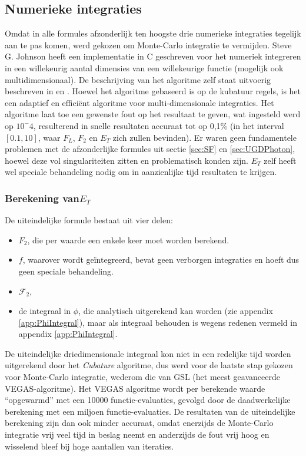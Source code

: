 \documentclass[a4paper,11pt]{article}
\numberwithin{equation}{section} %
\begin{document}
  \subsection{Numerieke integraties}
Omdat in alle formules afzonderlijk ten hoogste drie numerieke integraties tegelijk aan te pas komen, werd gekozen om Monte-Carlo integratie te vermijden.
Steve G. Johnson heeft een implementatie in C geschreven voor het numeriek integreren in een willekeurig aantal dimensies van een willekeurige functie (mogelijk ook multidimensionaal).
De beschrijving van het algoritme zelf staat uitvoerig beschreven in \cite{Genz} en \cite{Berntsen}.
Hoewel het algoritme gebaseerd is op de kubatuur regels, is het een adaptief en efficiënt algoritme voor multi-dimensionale integraties.
Het algoritme laat toe een gewenste fout op het resultaat te geven, wat ingesteld werd op $10^-4$, resulterend in snelle resultaten accuraat tot op 0,1\% (in het interval $[0.1,10]$, waar $F_L$, $F_2$ en $E_T$ zich zullen bevinden).
Er waren geen fundamentele problemen met de afzonderlijke formules uit sectie \ref{sec:SF} en \ref{sec:UGDPhoton}, hoewel deze vol singulariteiten zitten en problematisch konden zijn.
$E_T$ zelf heeft wel speciale behandeling nodig om in aanzienlijke tijd resultaten te krijgen.

  \subsubsection{Berekening van$E_T$}
De uiteindelijke formule bestaat uit vier delen:
\begin{itemize}
  \item $F_2$, die per waarde een enkele keer moet worden berekend.
  \item $f$, waarover wordt geïntegreerd, bevat geen verborgen integraties en hoeft dus geen speciale behandeling.
  \item $\mathcal{F}_2$,
  \item de integraal in $\phi$, die analytisch uitgerekend kan worden (zie appendix \ref{app:PhiIntegral}), maar als integraal behouden is wegens redenen vermeld in appendix \ref{app:PhiIntegral}.
\end{itemize}

De uiteindelijke driedimensionale integraal kon niet in een redelijke tijd worden uitgerekend door het \textit{Cubature} algoritme, dus werd voor de laatste stap gekozen voor Monte-Carlo integratie, wederom die van GSL (het meest geavanceerde VEGAS-algoritme).
Het VEGAS algoritme wordt per berekende waarde “opgewarmd” met een 10000 functie-evaluaties, gevolgd door de daadwerkelijke berekening met een miljoen functie-evaluaties.
De resultaten van de uiteindelijke berekening zijn dan ook minder accuraat, omdat enerzijds de Monte-Carlo integratie vrij veel tijd in beslag neemt en anderzijds de fout vrij hoog en wisselend bleef bij hoge aantallen van iteraties.
\end{document}
